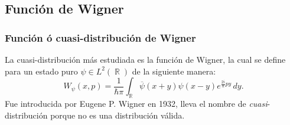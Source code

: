 \documentclass[10pt]{beamer}
\DeclareMathOperator{\R}{\mathbb{R}}
\DeclareMathOperator{\Tr}{Tr}
\begin{document}






  \subsection{Función de Wigner}

  \begin{frame}
    \frametitle{Función ó cuasi-distribución de Wigner}

    La cuasi-distribución más estudiada es la función de
    Wigner, la cual se define para un estado puro $\psi \in
    L^2(\R)$ de la siguiente manera:
    \begin{equation}
      W_\psi(x,p)
      = \frac{1}{\hbar \pi} \int_{\R}
      \overline{\psi}(x+y) \psi(x-y)
      e^{\frac{2i}{\hbar} p y } \, dy.
    \end{equation}
    Fue introducida por Eugene P. Wigner en 1932, lleva el
    nombre de \textit{cuasi}-distribución porque no es una
    distribución válida.
  \end{frame}
\end{document}
